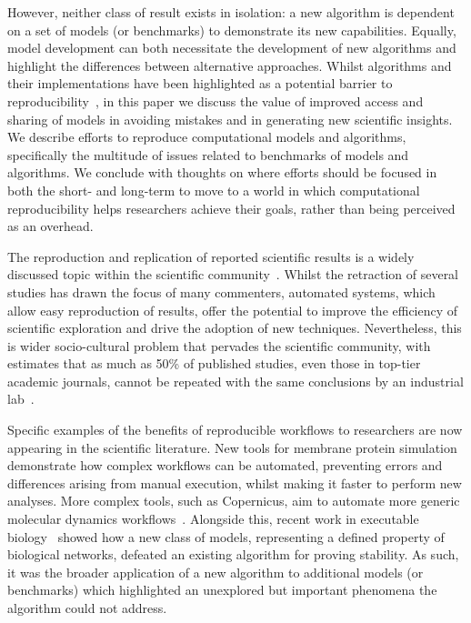 \documentclass[conference]{IEEEtran}
\begin{document}
However, neither class of result exists in isolation: a new algorithm is
dependent on a set of models (or benchmarks) to demonstrate its new
capabilities. Equally, model development can both necessitate the
development of new algorithms and highlight the differences between
alternative approaches. Whilst algorithms and their implementations
have been highlighted as a potential barrier to
reproducibility~\cite{crick-et-al_wssspe2}, in this paper we discuss the value
of improved access and sharing of models in avoiding mistakes and in
generating new scientific insights. We describe efforts to reproduce
computational models and algorithms, specifically the multitude of issues
related to benchmarks of models and algorithms. 
We conclude with thoughts %
on where efforts should be focused in both the short- and
long-term to move to a world in which computational reproducibility
helps researchers achieve their goals, rather than being perceived as
an overhead.


The reproduction and replication of reported scientific results is a
widely discussed topic within the scientific
community~\cite{barnes:2010,morin-et-al:2012,joppa-et-al:2013}.
Whilst the retraction of several studies has drawn the focus of many
commenters, automated systems, which allow easy reproduction of
results, offer the potential to improve the efficiency of scientific
exploration and drive the adoption of new techniques. Nevertheless,
this is wider socio-cultural problem that pervades the scientific
community, with estimates that as much as 50\% of published studies,
even those in top-tier academic journals, cannot be repeated with the
same conclusions by an industrial lab~\cite{osherovich:2011}.

Specific examples of the benefits of reproducible workflows to researchers 
are now appearing in the scientific literature. New tools for membrane protein simulation~\cite{Stansfeld,Hall2014}
demonstrate how complex workflows can be automated, preventing errors
and differences arising from manual execution, whilst making it faster
to perform new analyses. More complex tools, such as Copernicus, aim to 
automate more generic molecular dynamics workflows~\cite{Pronk}.
Alongside this, recent work in executable
biology~\cite{Cook} showed how a new class of models, representing a
defined property of biological networks, defeated an existing
algorithm for proving stability. As such, it was the broader
application of a new algorithm to additional models (or benchmarks)
which highlighted an unexplored but important phenomena the algorithm
could not address.
\end{document}
